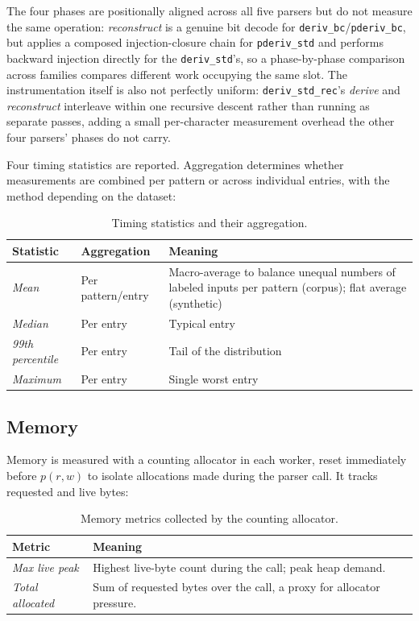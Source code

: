 The four phases are positionally aligned across
all five parsers but do not measure the same
operation: \emph{reconstruct} is a genuine bit
decode for \texttt{deriv\_bc}/\texttt{pderiv\_bc},
but applies a composed injection-closure chain
for \texttt{pderiv\_std} and performs backward
injection directly for the \texttt{deriv\_std}'s,
so a phase-by-phase comparison across families
compares different work occupying the same slot.
The instrumentation itself is also not perfectly
uniform: \texttt{deriv\_std\_rec}'s \emph{derive}
and \emph{reconstruct} interleave within one
recursive descent rather than running as separate
passes, adding a small per-character measurement
overhead the other four parsers' phases do not carry.

Four timing statistics are reported.
Aggregation determines whether measurements are combined
per pattern or across individual entries,
with the method depending on the dataset:

\begin{table}[ht]
\centering
\small
\renewcommand{\arraystretch}{1.15}
\begin{tabularx}{\textwidth}{@{}l l >{\raggedright\arraybackslash}X@{}}
\textbf{Statistic} & \textbf{Aggregation} & \textbf{Meaning} \\
\hline
\emph{Mean} & Per pattern/entry &
Macro-average to balance unequal numbers of labeled inputs
per pattern (corpus); flat average (synthetic) \\
\emph{Median} & Per entry & Typical entry \\
\emph{99th percentile} & Per entry & Tail of the distribution \\
\emph{Maximum} & Per entry & Single worst entry \\
\end{tabularx}
\caption{Timing statistics and their aggregation.}
\label{tab:eval-timing-statistics}
\end{table}

%
%
%

\subsection{Memory}
\label{sec:eval-criteria-memory}

Memory is measured with a counting allocator in each worker,
reset immediately before $p(r,w)$ to isolate allocations made during the parser call. 
It tracks requested and live bytes:
\begin{table}[ht]
\centering
\small
\renewcommand{\arraystretch}{1.15}
\begin{tabularx}{\textwidth}{@{}l >{\raggedright\arraybackslash}X@{}}
\textbf{Metric} & \textbf{Meaning} \\
\hline
\emph{Max live peak} & Highest live-byte count during the call; peak heap demand. \\
\emph{Total allocated} & Sum of requested bytes over the call, a proxy for allocator pressure. \\
\end{tabularx}
\caption{Memory metrics collected by the counting allocator.}
\label{tab:eval-memory-metrics}
\end{table}

